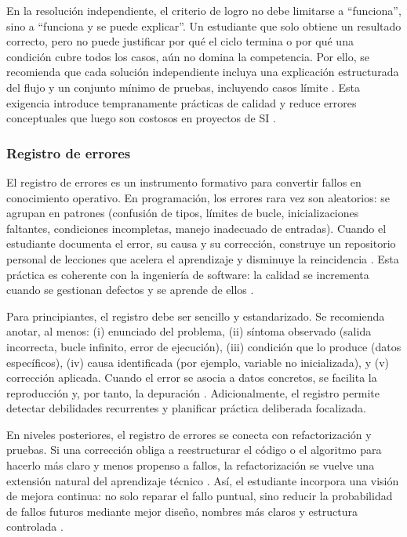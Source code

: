 \documentclass[12pt,twoside]{book}
\begin{document}
						En la resolución independiente, el criterio de logro no debe limitarse a “funciona”, sino a “funciona y se puede explicar”. Un estudiante que solo obtiene un resultado correcto, pero no puede justificar por qué el ciclo termina o por qué una condición cubre todos los casos, aún no domina la competencia. Por ello, se recomienda que cada solución independiente incluya una explicación estructurada del flujo y un conjunto mínimo de pruebas, incluyendo casos límite \cite{Cormen2022Introduction,Joyanes2007Fundamentos}. Esta exigencia introduce tempranamente prácticas de calidad y reduce errores conceptuales que luego son costosos en proyectos de SI \cite{Sommerville2015Software,SWEBOK2025Guide}.
						
					\subsubsection{Registro de errores}
						\noindent
						El registro de errores es un instrumento formativo para convertir fallos en conocimiento operativo. En programación, los errores rara vez son aleatorios: se agrupan en patrones (confusión de tipos, límites de bucle, inicializaciones faltantes, condiciones incompletas, manejo inadecuado de entradas). Cuando el estudiante documenta el error, su causa y su corrección, construye un repositorio personal de lecciones que acelera el aprendizaje y disminuye la reincidencia \cite{SWEBOK2025Guide,Pressman2019Software}. Esta práctica es coherente con la ingeniería de software: la calidad se incrementa cuando se gestionan defectos y se aprende de ellos \cite{Sommerville2015Software}.
						
						Para principiantes, el registro debe ser sencillo y estandarizado. Se recomienda anotar, al menos: (i) enunciado del problema, (ii) síntoma observado (salida incorrecta, bucle infinito, error de ejecución), (iii) condición que lo produce (datos específicos), (iv) causa identificada (por ejemplo, variable no inicializada), y (v) corrección aplicada. Cuando el error se asocia a datos concretos, se facilita la reproducción y, por tanto, la depuración \cite{Farrell2018Programming,Gaddis2022Starting}. Adicionalmente, el registro permite detectar debilidades recurrentes y planificar práctica deliberada focalizada.
						
						En niveles posteriores, el registro de errores se conecta con refactorización y pruebas. Si una corrección obliga a reestructurar el código o el algoritmo para hacerlo más claro y menos propenso a fallos, la refactorización se vuelve una extensión natural del aprendizaje técnico \cite{Abid2020Years,Lima2023Software,Martin2008Clean}. Así, el estudiante incorpora una visión de mejora continua: no solo reparar el fallo puntual, sino reducir la probabilidad de fallos futuros mediante mejor diseño, nombres más claros y estructura controlada \cite{McConnell2004Code,Sommerville2015Software}.
						
\end{document}

